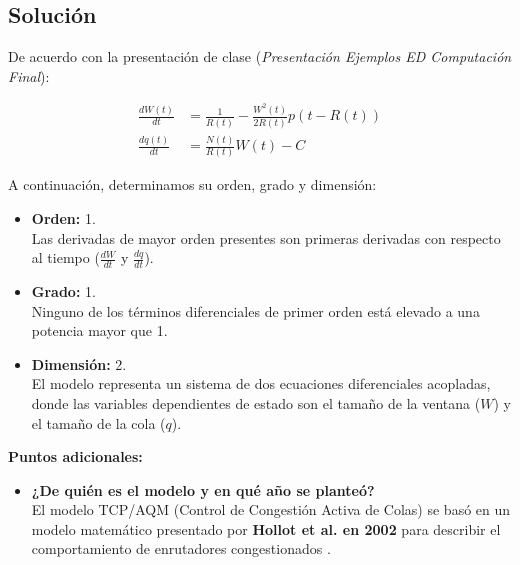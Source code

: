 \begin{enumerate}[label=\arabic*., leftmargin=*]
    \subsection{Solución}

    De acuerdo con la presentación de clase (\textit{Presentación Ejemplos ED Computación Final}):

    \begin{align*}
        \frac{dW(t)}{dt} &= \frac{1}{R(t)} - \frac{W^2(t)}{2R(t)} p(t - R(t)) \\
        \frac{dq(t)}{dt} &= \frac{N(t)}{R(t)} W(t) - C
    \end{align*}

    A continuación, determinamos su orden, grado y dimensión:

    \begin{itemize}[leftmargin=*]
        \item \textbf{Orden:} 1.\\
        Las derivadas de mayor orden presentes son primeras derivadas con respecto al tiempo ($\frac{dW}{dt}$ y $\frac{dq}{dt}$).
        
        \item \textbf{Grado:} 1.\\
        Ninguno de los términos diferenciales de primer orden está elevado a una potencia mayor que 1.
        
        \item \textbf{Dimensión:} 2.\\
        El modelo representa un sistema de dos ecuaciones diferenciales acopladas, donde las variables dependientes de estado son el tamaño de la ventana ($W$) y el tamaño de la cola ($q$).
    \end{itemize}

    \vspace{0.3cm}
    \textbf{Puntos adicionales:}

    \begin{itemize}[leftmargin=*]
        \item \textbf{¿De quién es el modelo y en qué año se planteó?}\\
        El modelo TCP/AQM (Control de Congestión Activa de Colas) se basó en un modelo matemático presentado por \textbf{Hollot et al. en 2002} para describir el comportamiento de enrutadores congestionados \cite{puerto_pina_tcp_aqm}. 


\end{itemize}
\end{enumerate}
